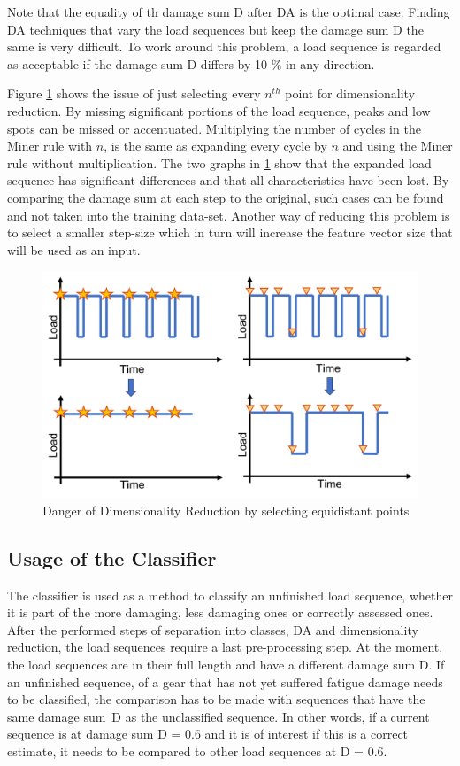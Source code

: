 Note that the equality of th damage sum D after DA is the optimal case. Finding DA techniques that vary the load sequences but keep the damage sum D the same is very difficult. To work around this problem, a load sequence is regarded as acceptable if the damage sum D differs by 10 \% in any direction.


Figure \ref{fig:UL} shows the issue of just selecting every \(n^{th}\) point for dimensionality reduction. By missing significant portions of the load sequence, peaks and low spots can be missed or accentuated. Multiplying the number of cycles in the Miner rule with \(n\), is the same as expanding every cycle by \(n\) and using the Miner rule without multiplication. The two graphs in \ref{fig:UL} show that the expanded load sequence has significant differences and that all characteristics have been lost. By comparing the damage sum at each step to the original, such cases can be found and not taken into the training data-set. Another way of reducing this problem is to select a smaller step-size which in turn will increase the feature vector size that will be used as an input. 

\begin{figure}[H]
	\centering
	\includegraphics[width=0.8\linewidth]{IMGs/Unlucky.png}
	\caption{Danger of Dimensionality Reduction by selecting equidistant points}
	\label{fig:UL}
\end{figure}
 
\subsection{Usage of the Classifier}
The classifier is used as a method to classify an unfinished load sequence, whether it is part of the more damaging, less damaging ones or correctly assessed ones. After the performed steps of separation into classes, DA and dimensionality reduction, the load sequences require a last pre-processing step. At the moment, the load sequences are in their full length and have a different damage sum D.
If an unfinished sequence, of a gear that has not yet suffered fatigue damage needs to be classified, the comparison has to be made with sequences that have the same damage sum~D as the unclassified sequence. In other words, if a current sequence is at damage sum D = 0.6 and it is of interest if this is a correct estimate, it needs to be compared to other load sequences at D = 0.6.
 
